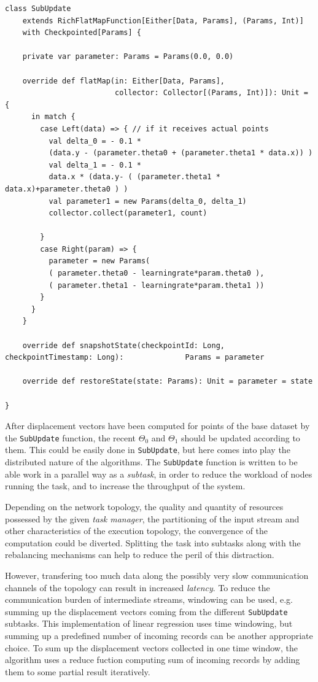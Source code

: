 {
\begin{verbatim}
class SubUpdate
    extends RichFlatMapFunction[Either[Data, Params], (Params, Int)]
    with Checkpointed[Params] {

    private var parameter: Params = Params(0.0, 0.0)
  
    override def flatMap(in: Either[Data, Params],
                         collector: Collector[(Params, Int)]): Unit = {
      in match {
        case Left(data) => { // if it receives actual points
          val delta_0 = - 0.1 * 
          (data.y - (parameter.theta0 + (parameter.theta1 * data.x)) )   
          val delta_1 = - 0.1 *
          data.x * (data.y- ( (parameter.theta1 * data.x)+parameter.theta0 ) )
          val parameter1 = new Params(delta_0, delta_1)
          collector.collect(parameter1, count)

        }
        case Right(param) => {
          parameter = new Params(
          ( parameter.theta0 - learningrate*param.theta0 ),
          ( parameter.theta1 - learningrate*param.theta1 ))
        }
      }
    }

    override def snapshotState(checkpointId: Long, checkpointTimestamp: Long): 				Params = parameter

    override def restoreState(state: Params): Unit = parameter = state

}
\end{verbatim}
}

After displacement vectors have been computed for points of the base dataset by the \verb:SubUpdate: function, the recent $\Theta_0$ and $\Theta_1$ should be updated according to them. This could be easily done in \verb:SubUpdate:, but here comes into play the distributed nature of the algorithms. The \verb:SubUpdate: function is written to be able work in a parallel way as a \textit{subtask}, in order to reduce the workload of nodes running the task, and to increase the throughput of the system. 

Depending on the network topology, the quality and quantity of resources possessed by the given \textit{task manager}, the partitioning of the input stream and other characteristics of the execution topology, the convergence of the computation could be diverted. Splitting the task into subtasks along with the rebalancing mechanisms can help to reduce the peril of this distraction.

However, transfering too much data along the possibly very slow communication channels of the topology can result in increased \textit{latency}. To reduce the communication burden of intermediate streams, windowing can be used, e.g. summing up the displacement vectors coming from the different \verb:SubUpdate: subtasks. This implementation of linear regression uses time windowing, but summing up a predefined number of incoming records can be another appropriate choice.
To sum up the displacement vectors collected in one time window, the algorithm uses a reduce fuction computing sum of incoming records by adding them to some partial result iteratively.

